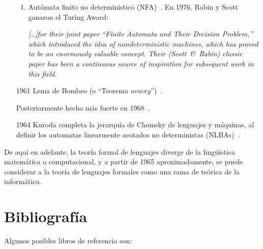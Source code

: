 \documentclass[spanish]{article}
\theoremstyle{definition}
\begin{document}
\begin{itemize}
\begin{enumerate}[leftmargin=.5cm, label=\alph*.]
    \item Autómata finito no deterministico (NFA)~\cite{RS59}. En 1976, Rabin y
    Scott ganaron el Turing Award:

    \textit{[\ldots]for their joint paper ``Finite Automata and Their Decision
      Problem,'' which introduced the idea of nondeterministic machines, which
    has proved to be an enormously valuable concept. Their (Scott~\&~Rabin)
  classic paper has been a continuous source of inspiration for subsequent work
in this field.}
\end{enumerate}

  \item[1961] Lema de Bombeo (o ``Teorema $uvwxy$'')~\cite{BarHillel61}.

    Posteriormente hecho más fuerte en 1968~\cite{Ogden1968}.
   \item[1964] Kuroda completa la jerarquía de Chomsky de lenguajes y máquinas,
     al definir los automatas linearmente acotados no deterministas
     (NLBAs)~\cite{Kur64}.

\end{itemize}

De aquí en adelante, la teoría formal de lenguajes diverge de la lingüística
matemática o computacional, y a partir de 1965 aproximadamente, se puede
considerar a la teoría de lenguajes formales como una rama de teórica de la
informática.


\section*{Bibliografía}

Algunos posibles libros de referencia son:
\end{document}
